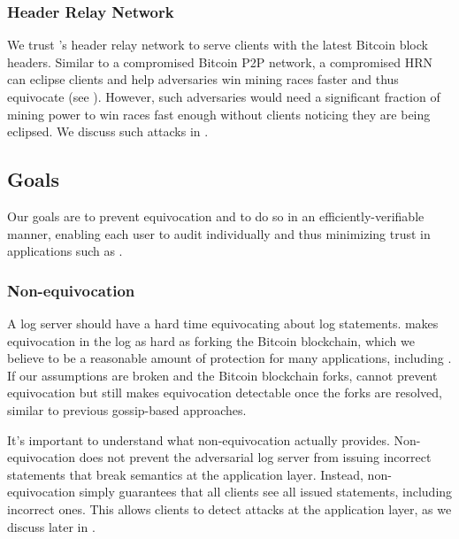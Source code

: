 \subsubsection{Header Relay Network}
We trust \Sys's header relay network to serve \Sys clients with the latest Bitcoin block headers.
Similar to a compromised Bitcoin P2P network, a compromised HRN can eclipse\cite{eclipse} \Sys clients and help adversaries win mining races faster and thus equivocate (see ).
However, such adversaries would need a significant fraction of mining power to win races fast enough without \Sys clients noticing they are being eclipsed.
We discuss such attacks in .

\subsection{Goals}
\label{sec:catena:goals}
Our goals are to prevent equivocation and to do so in an efficiently-verifiable manner, enabling each user to audit individually and thus minimizing trust in applications such as \pkds.

\subsubsection{Non-equivocation}
\label{sec:model:goals:noneq}
A log server should have a hard time equivocating about log statements.
\Sys makes equivocation in the log as hard as forking the Bitcoin blockchain, which we believe to be a reasonable amount of protection for many applications, including \pkds.
If our assumptions are broken and the Bitcoin blockchain forks, \Sys cannot prevent equivocation but still makes equivocation detectable once the forks are resolved, similar to previous gossip-based approaches\cite{ctgossip,ect,coniks,dtki}.

It's important to understand what non-equivocation actually provides.
Non-equivocation does not prevent the adversarial log server from issuing incorrect statements that break semantics at the application layer.
Instead, non-equivocation simply guarantees that all clients see all issued statements, including incorrect ones.
This allows clients to detect attacks at the application layer, as we discuss later in .

